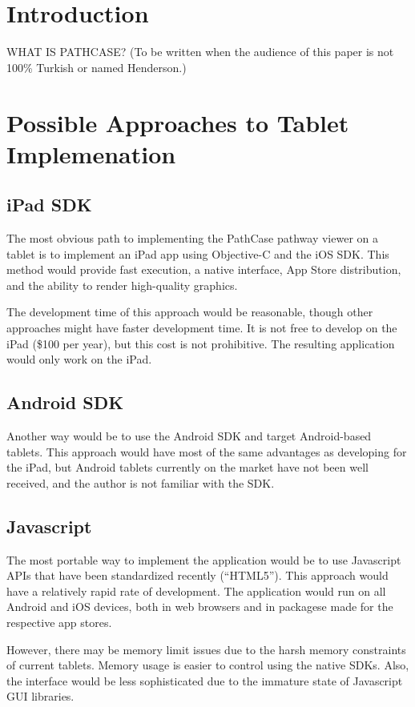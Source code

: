 \section{Introduction}

WHAT IS PATHCASE? (To be written when the audience of this paper is not 100\% Turkish or named Henderson.)

\section{Possible Approaches to Tablet Implemenation}

\subsection{iPad SDK}

The most obvious path to implementing the PathCase pathway viewer on a tablet is to implement an iPad app using Objective-C and the iOS SDK. This method would provide fast execution, a native interface, App Store distribution, and the ability to render high-quality graphics.

The development time of this approach would be reasonable, though other approaches might have faster development time. It is not free to develop on the iPad (\$100 per year), but this cost is not prohibitive. The resulting application would only work on the iPad.

\subsection{Android SDK}

Another way would be to use the Android SDK and target Android-based tablets. This approach would have most of the same advantages as developing for the iPad, but Android tablets currently on the market have not been well received, and the author is not familiar with the SDK.

\subsection{Javascript}

The most portable way to implement the application would be to use Javascript APIs that have been standardized recently (``HTML5''). This approach would have a relatively rapid rate of development. The application would run on all Android and iOS devices, both in web browsers and in packagese made for the respective app stores.

However, there may be memory limit issues due to the harsh memory constraints of current tablets. Memory usage is easier to control using the native SDKs. Also, the interface would be less sophisticated due to the immature state of Javascript GUI libraries.
